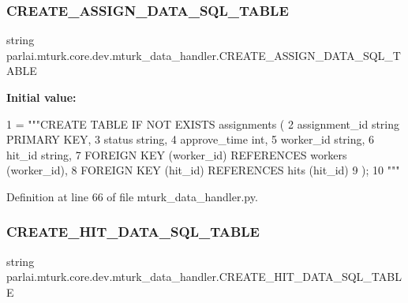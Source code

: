 \subsubsection{\texorpdfstring{C\+R\+E\+A\+T\+E\+\_\+\+A\+S\+S\+I\+G\+N\+\_\+\+D\+A\+T\+A\+\_\+\+S\+Q\+L\+\_\+\+T\+A\+B\+LE}{CREATE\_ASSIGN\_DATA\_SQL\_TABLE}}
{\footnotesize\ttfamily string parlai.\+mturk.\+core.\+dev.\+mturk\+\_\+data\+\_\+handler.\+C\+R\+E\+A\+T\+E\+\_\+\+A\+S\+S\+I\+G\+N\+\_\+\+D\+A\+T\+A\+\_\+\+S\+Q\+L\+\_\+\+T\+A\+B\+LE}

{\bfseries Initial value\+:}
\begin{DoxyCode}
1 =  \textcolor{stringliteral}{"""CREATE TABLE IF NOT EXISTS assignments (}
2 \textcolor{stringliteral}{        assignment\_id string PRIMARY KEY,}
3 \textcolor{stringliteral}{        status string,}
4 \textcolor{stringliteral}{        approve\_time int,}
5 \textcolor{stringliteral}{        worker\_id string,}
6 \textcolor{stringliteral}{        hit\_id string,}
7 \textcolor{stringliteral}{        FOREIGN KEY (worker\_id) REFERENCES workers (worker\_id),}
8 \textcolor{stringliteral}{        FOREIGN KEY (hit\_id) REFERENCES hits (hit\_id)}
9 \textcolor{stringliteral}{    );}
10 \textcolor{stringliteral}{    """}
\end{DoxyCode}


Definition at line 66 of file mturk\+\_\+data\+\_\+handler.\+py.

\mbox{\label{namespaceparlai_1_1mturk_1_1core_1_1dev_1_1mturk__data__handler_a3e4e8efbdbbfbfcf841ffc1cfb5c741a}} 
\subsubsection{\texorpdfstring{C\+R\+E\+A\+T\+E\+\_\+\+H\+I\+T\+\_\+\+D\+A\+T\+A\+\_\+\+S\+Q\+L\+\_\+\+T\+A\+B\+LE}{CREATE\_HIT\_DATA\_SQL\_TABLE}}
{\footnotesize\ttfamily string parlai.\+mturk.\+core.\+dev.\+mturk\+\_\+data\+\_\+handler.\+C\+R\+E\+A\+T\+E\+\_\+\+H\+I\+T\+\_\+\+D\+A\+T\+A\+\_\+\+S\+Q\+L\+\_\+\+T\+A\+B\+LE}

